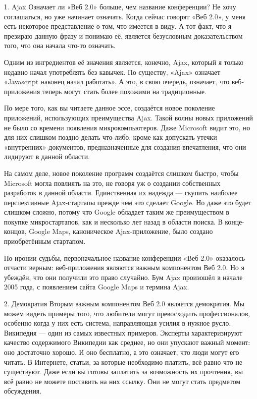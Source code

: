 \documentclass[ebook,12pt,oneside,openany]{memoir}
\begin{document}
1. Ajax Означает ли «Веб 2.0» больше, чем название конференции? Не
хочу соглашаться, но уже начинает означать. Когда сейчас говорят «Веб
2.0», у меня есть некоторое представление о том, что имеется в виду. А
тот факт, что я презираю данную фразу и понимаю её, является
безусловным доказательством того, что она начала что-то означать.

Одним из ингредиентов её значения является, конечно, Ajax, который я
только недавно начал употреблять без кавычек. По существу, «Ajax»
означает «Javascript наконец начал работать». А это, в свою очередь,
означает, что веб-приложения теперь могут стать более похожими на
традиционные.

По мере того, как вы читаете данное эссе, создаётся новое поколение
приложений, использующих преимущества Ajax. Такой волны новых
приложений не было со времени появления микрокомпьютеров. Даже
Microsoft видит это, но для них слишком поздно делать что-либо, кроме
как допускать утечки «внутренних» документов, предназначенные для
создания впечатления, что они лидируют в данной области.

На самом деле, новое поколение программ создаётся слишком быстро,
чтобы Microsoft могла повлиять на это, не говоря уж о создании
собственных разработок в данной области. Единственная их надежда —
скупить наиболее перспективные Ajax-стартапы прежде чем это сделает
Google. Но даже это будет слишком сложно, потому что Google обладает
таким же преимуществом в покупке микростартапов, как и несколько лет
назад в области поиска. В конце-концов, Google Maps, каноническое
Ajax-приложение, было создано приобретённым стартапом.

По иронии судьбы, первоначальное название конференции «Веб 2.0»
оказалось отчасти верным: веб-приложения являются важным компонентом
Веб 2.0. Но я убеждён, что они получили это право случайно. Бум Ajax
произошёл в начале 2005 года, с появлением сайта Google Maps и термина
Ajax.

2. Демократия Вторым важным компонентом Веб 2.0 является демократия.
Мы можем видеть примеры того, что любители могут превосходить
профессионалов, особенно когда у них есть система, направляющая усилия
в нужное русло. Википедия — один из самых известных примеров. Эксперты
характеризируют качество содержимого Википедии как среднее, но они
упускают важный момент: оно достаточно хорошо. И оно бесплатно, а это
означает, что люди могут его читать. В Интернете, статьи, за которые
необходимо платить, всё равно что не существуют. Даже если вы готовы
заплатить за возможность их прочтения, вы всё равно не можете
поставить на них ссылку. Они не могут стать предметом обсуждения.
\end{document}

